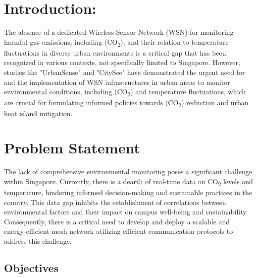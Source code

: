 \section{Introduction:}\label{sec:introduction}

The absence of a dedicated Wireless Sensor Network (WSN) for monitoring harmful gas emissions, including (CO\textsubscript{2}), and their relation to temperature fluctuations in diverse urban environments is a critical gap that has been recognized in various contexts, not specifically limited to Singapore. However, studies like "UrbanSense" \cite{Rainham2016A} and "CitySee" \cite{Liu2013CitySee} have demonstrated the urgent need for and the implementation of WSN infrastructures in urban areas to monitor environmental conditions, including (CO\textsubscript{2}) and temperature fluctuations, which are crucial for formulating informed policies towards (CO\textsubscript{2}) reduction and urban heat island mitigation.

\section{Problem Statement}\label{sec:problem_statement}
The lack of comprehensive environmental monitoring poses a significant challenge within Singapore. Currently, there is a dearth of real-time data on CO\textsubscript{2} levels and temperature, hindering informed decision-making and sustainable practices in the country. This data gap inhibits the establishment of correlations between environmental factors and their impact on campus well-being and sustainability. Consequently, there is a critical need to develop and deploy a scalable and energy-efficient mesh network utilizing efficient communication protocols to address this challenge. 

\subsection{Objectives}\label{sec:objectives}


